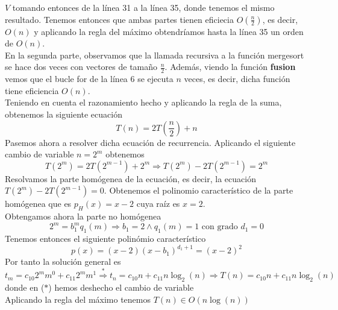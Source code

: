 \documentclass[11pt,openany]{book}
\begin{document}
$V$ tomando entonces de la línea 31 a la línea 35, donde tenemos el mismo resultado. Tenemos entonces que ambas partes
tienen eficiecia $O(\frac{n}{2})$, es decir, $O(n)$ y aplicando la regla del máximo obtendríamos hasta la línea 35 un
orden de $O(n)$. \\
En la segunda parte, observamos que la llamada recursiva a la función mergesort se hace dos veces con vectores de tamaño $\frac{n}{2}$.
Además, viendo la función \textbf{fusion} vemos que el bucle for de la línea 6 se ejecuta $n$ veces, es decir, dicha función
tiene eficiencia $O(n)$. \\
Teniendo en cuenta el razonamiento hecho y aplicando la regla de la suma, obtenemos la siguiente ecuación
\begin{equation*}
    T(n)=2T(\frac{n}{2})+n
\end{equation*}
Pasemos ahora a resolver dicha ecuación de recurrencia. Aplicando el siguiente cambio de variable $n=2^m$ obtenemos
\begin{equation*}
    T(2^m)=2T(2^{m-1})+2^m \Longrightarrow T(2^m)-2T(2^{m-1})=2^m
\end{equation*}
Resolvamos la parte homógenea de la ecuación, es decir, la ecuación $T(2^m)-2T(2^{m-1})=0$. Obtenemos el polinomio
característico de la parte homógenea que es $p_H(x)=x-2$ cuya raíz es $x=2$. \\
Obtengamos ahora la parte no homógenea
\begin{equation*}
    2^m=b_1^m q_1(m) \Longrightarrow b_1=2 \wedge q_1(m)=1 \text{ con grado } d_1=0
\end{equation*}
Tenemos entonces el siguiente polinómio característico
\begin{equation*}
    p(x)=(x-2)(x-b_1)^{d_1+1}=(x-2)^2
\end{equation*}
Por tanto la solución general es
\begin{equation*}
    t_m=c_{10}2^mm^0+c_{11}2^mm^1  \overset{*}{\Longrightarrow}  t_n=c_{10}n+c_{11}n\log_2(n) \Longrightarrow T(n)=c_{10}n+c_{11}n\log_2(n)
\end{equation*}
donde en ($*$) hemos deshecho el cambio de variable \\
Aplicando la regla del máximo tenemos $T(n) \in O(n\log(n))$
\end{document}
